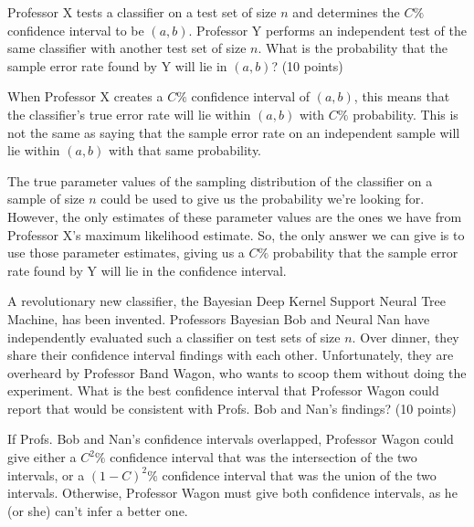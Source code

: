 \documentclass[fleqn]{homework}
\begin{document}
  \begin{problem}{3}
    \begin{question}
      Professor X tests a classifier on a test set of size $n$ and determines
      the $C\%$ confidence interval to be $(a,b)$.  Professor Y performs an
      independent test of the same classifier with another test set of size $n$.
      What is the probability that the sample error rate found by Y will lie in
      $(a,b)$? (10 points)
    \end{question}

    When Professor X creates a $C\%$ confidence interval of $(a,b)$, this means
    that the classifier's true error rate will lie within $(a,b)$ with $C\%$
    probability.  This is not the same as saying that the sample error rate on
    an independent sample will lie within $(a,b)$ with that same probability.

    The true parameter values of the sampling distribution of the classifier on
    a sample of size $n$ could be used to give us the probability we're looking
    for.  However, the only estimates of these parameter values are the ones we
    have from Professor X's maximum likelihood estimate.  So, the only answer we
    can give is to use those parameter estimates, giving us a $C\%$ probability
    that the sample error rate found by Y will lie in the confidence interval.
  \end{problem}

  \begin{problem}{4}
    \begin{question}
      A revolutionary new classifier, the Bayesian Deep Kernel Support Neural
      Tree Machine, has been invented.  Professors Bayesian Bob and Neural Nan
      have independently evaluated such a classifier on test sets of size $n$.
      Over dinner, they share their confidence interval findings with each
      other.  Unfortunately, they are overheard by Professor Band Wagon, who
      wants to scoop them without doing the experiment.  What is the best
      confidence interval that Professor Wagon could report that would be
      consistent with Profs. Bob and Nan's findings? (10 points)
    \end{question}

    If Profs. Bob and Nan's confidence intervals overlapped, Professor Wagon
    could give either a $C^2\%$ confidence interval that was the intersection of
    the two intervals, or a $(1-C)^2\%$ confidence interval that was the union
    of the two intervals.  Otherwise, Professor Wagon must give both confidence
    intervals, as he (or she) can't infer a better one.
  \end{problem}
\end{document}
